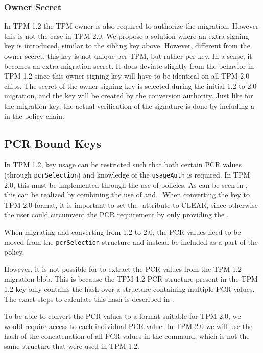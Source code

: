 {\subsubsection{Owner Secret}
In TPM 1.2 the TPM owner is also required to authorize the migration. However this is not the case in TPM 2.0. We propose a solution where an extra signing key is introduced, similar to the sibling key above. However, different from the owner secret, this key is not unique per TPM, but rather per key. In a sense, it becomes an extra migration secret. It does deviate slightly from the behavior in TPM 1.2 since this owner signing key will have to be identical on all TPM 2.0 chips. The secret of the owner signing key is selected during the initial 1.2 to 2.0 migration, and the key will be created by the conversion authority. Just like for the migration key, the actual verification of the signature is done by including a  in the policy chain.

\subsection{PCR Bound Keys} \label{sec:pcrboundkeys}

In TPM 1.2, key usage can be restricted such that both certain PCR values (through \texttt{pcrSelection}) and knowledge of the \texttt{usageAuth} is required. In TPM 2.0, this must be implemented through the use of policies. As can be seen in \cite[Part 1, Annex A]{TPM2.0r16}, this can be realized by combining the use of  and . When converting the key to TPM 2.0-format, it is important to set the -attribute to CLEAR, since otherwise the user could circumvent the PCR requirement by only providing the .

When migrating and converting from 1.2 to 2.0, the PCR values need to be moved from the \texttt{pcrSelection} structure and instead be included as a part of the  policy.

However, it is not possible for \ca{} to extract the PCR values from the TPM 1.2 migration blob. This is because the TPM 1.2 PCR structure present in the TPM 1.2 key only contains the hash over a structure containing multiple PCR values. The exact steps to calculate this hash is described in \cite[Part 2, Sec. 5.4.1]{TPM1.2spec}.

To be able to convert the PCR values to a format suitable for TPM 2.0, we would require access to each individual PCR value. In TPM 2.0 we will use the hash of the concatenation of all PCR values
in the  command, which is not the same structure that were used in TPM 1.2.

}
